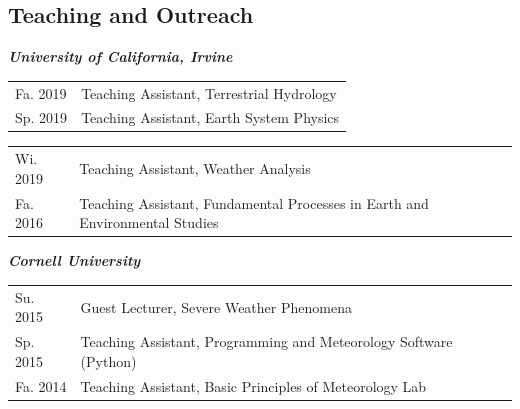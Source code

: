 \documentclass[margin,line,palatino,courier,10pt]{res}
\begin{document}
\begin{resume}
\section{\sc \textcolor{Cerulean}{\large{\textbf{Teaching and Outreach}}}}

\textit{\textbf{University of California, Irvine}}
\vspace*{0.05in}\\
\begin{tabular}{@{}p{0.9in}p{4in}}
Fa. 2019 & Teaching Assistant, Terrestrial Hydrology\\
Sp. 2019 & Teaching Assistant, Earth System Physics\\
\end{tabular}
\begin{tabular}{@{}p{0.9in}p{4in}}
Wi. 2019 & Teaching Assistant, Weather Analysis\\
Fa. 2016 & Teaching Assistant, Fundamental Processes in Earth and Environmental Studies\\
\end{tabular}

\textit{\textbf{Cornell University}}
\vspace*{0.05in}\\
\begin{tabular}{@{}p{0.9in}p{4in}}
Su. 2015 & Guest Lecturer, Severe Weather Phenomena\\
Sp. 2015 & Teaching Assistant, Programming and Meteorology Software (Python)\\
Fa. 2014 & Teaching Assistant, Basic Principles of Meteorology Lab\\
\end{tabular}


\end{resume}
\end{document}
